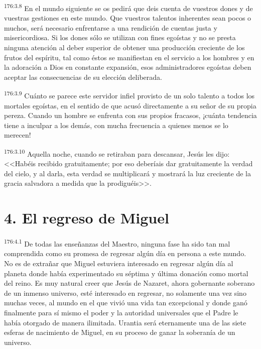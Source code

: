 \par 
\textsuperscript{176:3.8} En el mundo siguiente se os pedirá que deis cuenta de vuestros dones y de vuestras gestiones en este mundo. Que vuestros talentos inherentes sean pocos o muchos, será necesario enfrentarse a una rendición de cuentas justa y misericordiosa. Si los dones sólo se utilizan con fines egoístas y no se presta ninguna atención al deber superior de obtener una producción creciente de los frutos del espíritu, tal como éstos se manifiestan en el servicio a los hombres y en la adoración a Dios en constante expansión, esos administradores egoístas deben aceptar las consecuencias de su elección deliberada.

\par 
\textsuperscript{176:3.9} Cuánto se parece este servidor infiel provisto de un solo talento a todos los mortales egoístas, en el sentido de que acusó directamente a su señor de su propia pereza. Cuando un hombre se enfrenta con sus propios fracasos, ¡cuánta tendencia tiene a inculpar a los demás, con mucha frecuencia a quienes menos se lo merecen!

\par 
\textsuperscript{176:3.10} Aquella noche, cuando se retiraban para descansar, Jesús les dijo: <<Habéis recibido gratuitamente; por eso deberíais dar gratuitamente la verdad del cielo, y al darla, esta verdad se multiplicará y mostrará la luz creciente de la gracia salvadora a medida que la prodiguéis>>.

\section*{4. El regreso de Miguel}
\par 
\textsuperscript{176:4.1} De todas las enseñanzas del Maestro, ninguna fase ha sido tan mal comprendida como su promesa de regresar algún día en persona a este mundo. No es de extrañar que Miguel estuviera interesado en regresar algún día al planeta donde había experimentado su séptima y última donación como mortal del reino. Es muy natural creer que Jesús de Nazaret, ahora gobernante soberano de un inmenso universo, esté interesado en regresar, no solamente una vez sino muchas veces, al mundo en el que vivió una vida tan excepcional y donde ganó finalmente para sí mismo el poder y la autoridad universales que el Padre le había otorgado de manera ilimitada. Urantia será eternamente una de las siete esferas de nacimiento de Miguel, en su proceso de ganar la soberanía de un universo.

